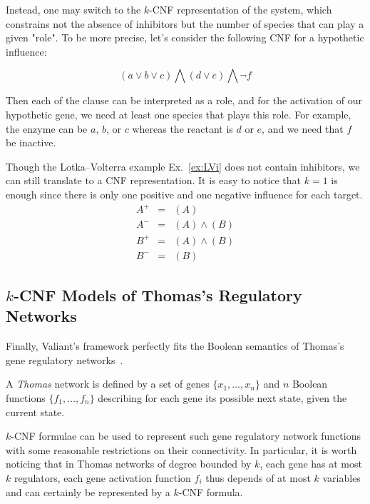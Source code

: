 \documentclass{llncs}
\begin{document}
Instead, one may switch to the $k$-CNF representation of the system, which constrains not the absence of inhibitors but the number of species that can play a given "role". To be more precise, let's consider the following CNF for a hypothetic influence:

\[
\left(a \vee b \vee c\right) \bigwedge
\left(d \vee e\right) \bigwedge 
\neg f
\]

Then each of the clause can be interpreted as a role, and for the activation of our hypothetic gene, we need at least one species that plays this role. For example, the enzyme can be $a$, $b$, or $c$ whereas 
the reactant is $d$ or $e$, and we need that $f$ be inactive.


\begin{example}
   Though the Lotka--Volterra example Ex.~\ref{ex:LVi} does not contain
   inhibitors, we can still translate to a CNF representation. It is easy to
   notice that $k=1$ is enough since there is only one positive and one
   negative influence for each target.
\begin{eqnarray*}
   A^+&=&(A)\\
A^-&=&(A) \wedge (B)\\
B^+&=&(A)\wedge (B)\\
   B^-&=&(B)
\end{eqnarray*}

\end{example}


\subsection{$k$-CNF Models of Thomas's Regulatory Networks}

Finally, Valiant's framework perfectly fits the Boolean semantics of Thomas's gene
regulatory networks~\cite{Thomas73jtb}.

\begin{definition}
   A \emph{Thomas} network is defined by a set of genes $\{x_1,\dots,x_n\}$
   and $n$ Boolean functions $\{f_1,\dots,f_n\}$ describing for each gene its
   possible next state, given the current state.
\end{definition}

$k$-CNF formulae can be used to represent such gene regulatory network functions with some reasonable restrictions on their connectivity.
In particular, it is worth noticing that in Thomas networks of degree bounded by $k$,
each gene has at most $k$ regulators, each gene activation function $f_i$ thus depends of at most $k$ variables
and can certainly be represented by a $k$-CNF formula.
\end{document}
